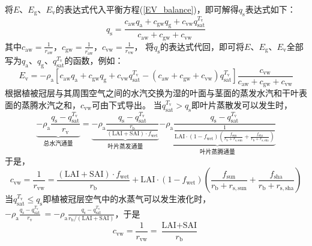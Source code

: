 将$E$、$E_{\mathrm{g}}$、$E_{\mathrm{v}}$的表达式代入平衡方程(\ref{EV_balance})，即可解得$q_{\mathrm {s}}$表达式如下：
\begin{equation}\label{Eg_2}
  q_{\mathrm{s}}=\frac{c_{\mathrm{aw}} q_{\mathrm{a}}+c_{\mathrm{gw}} q_{\mathrm{g}}+c_{\mathrm{vw}} q_{\mathrm{s a t}}^{T_{\mathrm{v}}}}{c_{\mathrm{aw}}+c_{\mathrm{gw}}+c_{\mathrm{vw}}}
\end{equation}
其中$c_{\mathrm{aw}}=\frac{1}{r_{\mathrm{aw}}}$，$c_{\mathrm{gw}}=\frac{1}{r_{\mathrm{aw}}^\prime}$，$c_{\mathrm{vw}}=\frac{1}{r_{\mathrm{vw}}}$，
将$q_{\mathrm {s}}$的表达式代回，即可将$E$、$E_{\mathrm{g}}$、$E_{\mathrm{v}}$全部写为$q_{\mathrm{a}}$、$q_{\mathrm {g}}$、$q_{\mathrm{sat}}^{T_{\mathrm v}}$的函数，例如：
\begin{equation}\label{Ev}
  E_{\mathrm{v}}=-\rho_{\mathrm{a}}\left[c_{\mathrm{aw}} q_{\mathrm{a}}+c_{\mathrm{gw}} q_{\mathrm{g}}+c_{\mathrm{vw}} q_{\mathrm{s a t}}^{T_{\mathrm{v}}}-
  \left(c_{\mathrm{aw}}+c_{\mathrm{gw}}+c_{\mathrm{vw}}\right) q_{\mathrm{s a t}}^{T_{\mathrm{v}}}\right] \frac{c_{\mathrm{vw}}}{c_{\mathrm{aw}}+c_{\mathrm{gw}}+c_{\mathrm{vw}}}
\end{equation}
根据植被冠层与其周围空气之间的水汽交换为湿的叶面与茎面的蒸发水汽和干叶表面的蒸腾水汽之和，$c_{\mathrm{vw}}$可由下式导出。
当$q_{\mathrm{sat}}^{T_{\mathrm v}}>q_{\mathrm {s}}$即叶片蒸散发可以发生时，%
\begin{equation}
  \underbrace{-\rho_{\mathrm{a}} \frac{q_{\mathrm{s}}-q_{\mathrm{s a t}}^{T_{\mathrm{v}}}}{r_{\mathrm{{v }}}}}_{\text{总水汽通量}}
  =\underbrace{-\rho_{\mathrm{a}}
  \frac{q_{\mathrm{s}}-q_{\mathrm{s a t}}^{T_{\mathrm{v}}}}{\frac{r_{\mathrm{b}}}{(\text {LAI}+\text {SAI}) \cdot f_{\mathrm{{wet }}}}}}_{\text{叶片蒸发通量}}
  \underbrace{-\rho_{\mathrm{a}} \frac{q_{\mathrm{s}}-q_{\mathrm{s a t}}^{T_{\mathrm{v}}}}{\frac{1}{\text {LAI} \cdot \left(1-f_{\mathrm{wet}}\right)\left(\frac{f_{\mathrm{sun}}}{r_{\mathrm{b}}+r_{\mathrm{s,sun}}} + \frac{f_{\mathrm{sha}}}{r_{\mathrm{b}}+r_{\mathrm{s,sha}}}\right)}}}_{\text{叶片蒸腾通量}}
\end{equation}
于是，
\begin{equation}
  c_{\mathrm{vw}}=\frac{1}{r_{\mathrm{vw}}}=\frac{(\text {LAI}+\text {SAI}) \cdot f_{\mathrm{{wet }}}}{r_{\mathrm{b}}}+\text {LAI} \cdot \left(1-f_{\mathrm{wet}}\right)\left(\frac{f_{\mathrm{sun}}}{r_{\mathrm{b}}+r_{\mathrm{s,sun}}} + \frac{f_{\mathrm{sha}}}{r_{\mathrm{b}}+r_{\mathrm{s,sha}}}\right)
\end{equation}
当$q_{\mathrm{sat}}^{T_{\mathrm v}}\leqslant q_{\mathrm {s}}$即植被冠层空气中的水蒸气可以发生液化时，
$-\rho_{\mathrm{a}}\frac{q_{\mathrm {s}}-q_{\mathrm{sat}}^{T_{\mathrm v}}}{r_{\mathrm{v}}}\ =-\rho_{\mathrm{a}} \frac{q_{\mathrm {s}}-q_{\mathrm{sat}}^{T_{\mathrm v}}}{r_{\mathrm {b}}/\left(\text {LAI}+\text {SAI}\right)}$，于是
\begin{equation}
  c_{\mathrm{vw}}=\frac{1}{r_{\mathrm{{vw }}}}=\frac{\text {LAI}+\text {SAI}}{r_{\mathrm{b}}}
\end{equation}

